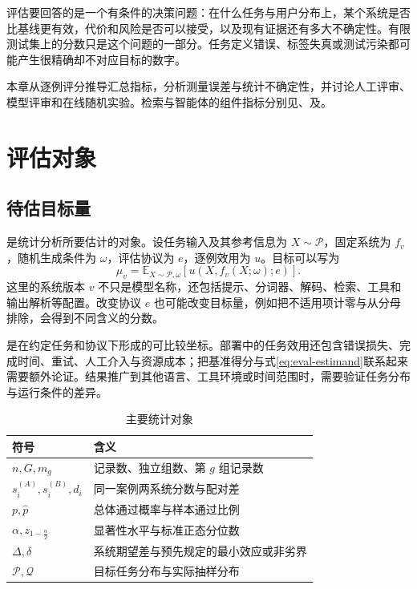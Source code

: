 \documentclass[../textbook.tex]{subfiles}
\begin{document}
\fi
{}

评估要回答的是一个有条件的决策问题：在什么任务与用户分布上，某个系统是否比基线更有效，代价和风险是否可以接受，以及现有证据还有多大不确定性。有限测试集上的分数只是这个问题的一部分。任务定义错误、标签失真或测试污染都可能产生很精确却不对应目标的数字。

本章从逐例评分推导汇总指标，分析测量误差与统计不确定性，并讨论人工评审、模型评审和在线随机实验。检索与智能体的组件指标分别见、及。

\section{评估对象}

\subsection{待估目标量}
是统计分析所要估计的对象。设任务输入及其参考信息为 $X\sim\mathcal P$，固定系统为 $f_v$，随机生成条件为 $\omega$，评估协议为 $e$，逐例效用为 $u$。目标可以写为
\begin{equation}
 \mu_v=\mathbb E_{X\sim\mathcal P,\omega}\left[u(X,f_v(X;\omega);e)\right].
 \label{eq:eval-estimand}
\end{equation}
这里的系统版本 $v$ 不只是模型名称，还包括提示、分词器、解码、检索、工具和输出解析等配置。改变协议 $e$ 也可能改变目标量，例如把不适用项计零与从分母排除，会得到不同含义的分数。

是在约定任务和协议下形成的可比较坐标。部署中的任务效用还包含错误损失、完成时间、重试、人工介入与资源成本；把基准得分与式\eqref{eq:eval-estimand}联系起来需要额外论证。结果推广到其他语言、工具环境或时间范围时，需要验证任务分布与运行条件的差异。

\begin{table}[htbp]
\centering
\caption{主要统计对象}\label{tab:evaluation-statistics-symbols}
\begin{tabular}{ll}
\toprule
符号 & 含义\\
\midrule
$n,G,m_g$ & 记录数、独立组数、第 $g$ 组记录数\\
$s_i^{(A)},s_i^{(B)},d_i$ & 同一案例两系统分数与配对差\\
$p,\hat p$ & 总体通过概率与样本通过比例\\
$\alpha,z_{1-\frac{\alpha}{2}}$ & 显著性水平与标准正态分位数\\
$\Delta,\delta$ & 系统期望差与预先规定的最小效应或非劣界\\
$\mathcal P,\mathcal Q$ & 目标任务分布与实际抽样分布\\
\bottomrule
\end{tabular}
\end{table}
\end{document}

